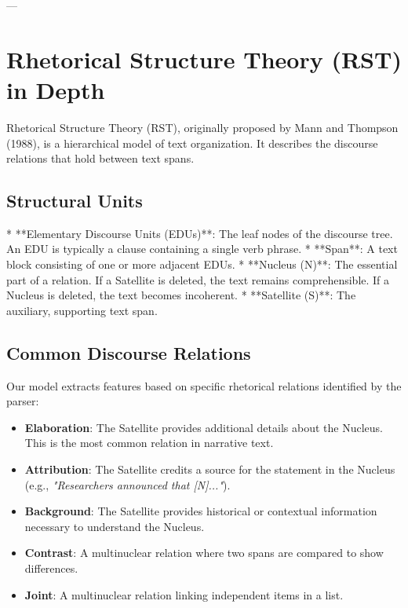 \documentclass[11pt,a4paper]{article}
\begin{document}
---

\section{Rhetorical Structure Theory (RST) in Depth}

Rhetorical Structure Theory (RST), originally proposed by Mann and Thompson (1988), is a hierarchical model of text organization. It describes the discourse relations that hold between text spans.

\subsection{Structural Units}
* **Elementary Discourse Units (EDUs)**: The leaf nodes of the discourse tree. An EDU is typically a clause containing a single verb phrase.
* **Span**: A text block consisting of one or more adjacent EDUs.
* **Nucleus (N)**: The essential part of a relation. If a Satellite is deleted, the text remains comprehensible. If a Nucleus is deleted, the text becomes incoherent.
* **Satellite (S)**: The auxiliary, supporting text span.

\subsection{Common Discourse Relations}
Our model extracts features based on specific rhetorical relations identified by the parser:
\begin{itemize}
    \item \textbf{Elaboration}: The Satellite provides additional details about the Nucleus. This is the most common relation in narrative text.
    \item \textbf{Attribution}: The Satellite credits a source for the statement in the Nucleus (e.g., \textit{"Researchers announced that [N]..."}).
    \item \textbf{Background}: The Satellite provides historical or contextual information necessary to understand the Nucleus.
    \item \textbf{Contrast}: A multinuclear relation where two spans are compared to show differences.
    \item \textbf{Joint}: A multinuclear relation linking independent items in a list.
\end{itemize}
\end{document}
